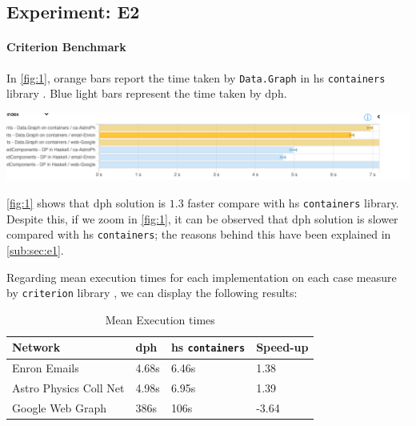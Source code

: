 \documentclass[preprint]{elsarticle}
\begin{document}
\subsection{Experiment: E2}
\paragraph{Criterion Benchmark}
In \autoref{fig:1}, orange bars report the time taken by \texttt{Data.Graph} in \acrshort{hs} \texttt{containers} library \cite{containers}. Blue light bars represent the time taken by \acrshort{dph}.

\begin{minipage}[t]{\linewidth}
  \includegraphics[width=\textwidth]{bench_1.png}
  \captionsetup{type=figure}
  \label{fig:1}
\end{minipage}

\autoref{fig:1} shows that \acrshort{dph} solution is $1.3$ faster compare with \acrshort{hs} \texttt{containers} library. Despite this, if we zoom  in \autoref{fig:1}, it can be observed that \acrshort{dph} solution is slower compared with \acrshort{hs} \texttt{containers}; the reasons behind this have been explained in \autoref{sub:sec:e1}.

 Regarding mean execution times for each implementation on each case measure by \texttt{criterion} library \cite{criterion}, we can display the following results:

\begin{table}[H]
  \centering
  \begin{tabular}{|l|l|l|l|}
   \hline
   \textbf{Network} & \textbf{\acrshort{dph}} & \textbf{\acrshort{hs} \texttt{containers}} & \textbf{Speed-up}\\
   \hline
   Enron Emails & 4.68s &  6.46s & 1.38\\
   \hline
   Astro Physics Coll Net & 4.98s & 6.95s  & 1.39\\
   \hline
   Google Web Graph & 386s & 106s & -3.64\\
   \hline
  \end{tabular}
 \caption{Mean Execution times}
 \label{table:6}
 \end{table}
\end{document}
